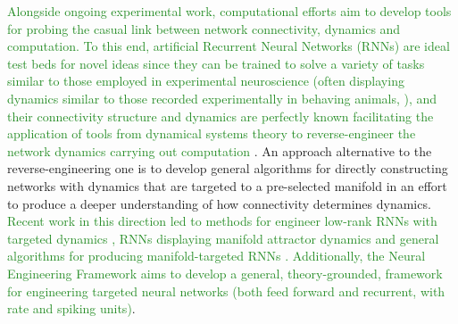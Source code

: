 \textcolor{ForestGreen}{Alongside ongoing experimental work, computational efforts aim to develop tools for probing the
casual link between network connectivity, dynamics and computation. To this end, artificial Recurrent Neural Networks
(RNNs) are ideal test beds for novel ideas since they can be trained to solve a variety of tasks similar to those
employed in experimental neuroscience (often displaying dynamics similar to those recorded experimentally in behaving
animals, ), and their connectivity structure and dynamics are
perfectly known facilitating the application of tools from dynamical systems theory to reverse-engineer the network
dynamics carrying out computation }. An approach alternative to the reverse-engineering one is to develop general algorithms for directly
constructing networks with dynamics that are targeted to a pre-selected manifold in an effort to produce a deeper
understanding of how connectivity determines dynamics.
\textcolor{ForestGreen}{Recent work in this direction led to methods for engineer low-rank RNNs with targeted dynamics
, RNNs displaying manifold attractor dynamics  and
general algorithms for producing manifold-targeted RNNs . Additionally, the
Neural Engineering Framework  aims to develop a general,
theory-grounded, framework for engineering targeted neural networks (both feed forward and recurrent, with rate and
spiking units)}.


